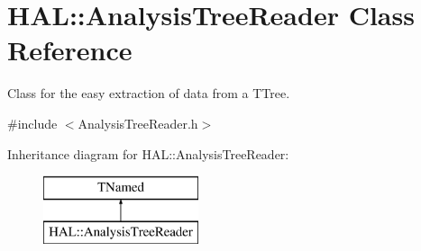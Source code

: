 \hypertarget{class_h_a_l_1_1_analysis_tree_reader}{\section{H\+A\+L\+:\+:Analysis\+Tree\+Reader Class Reference}
\label{class_h_a_l_1_1_analysis_tree_reader}
}


Class for the easy extraction of data from a T\+Tree.  




{\ttfamily \#include $<$Analysis\+Tree\+Reader.\+h$>$}

Inheritance diagram for H\+A\+L\+:\+:Analysis\+Tree\+Reader\+:\begin{figure}[H]
\begin{center}
\leavevmode
\includegraphics[height=2.000000cm]{class_h_a_l_1_1_analysis_tree_reader}
\end{center}
\end{figure}
